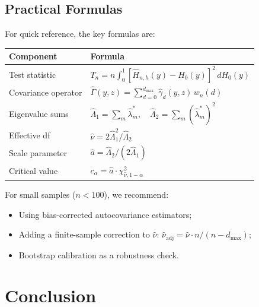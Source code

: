 \subsection{Practical Formulas}

For quick reference, the key formulas are:

\begin{tabular}{ll}
\toprule
\textbf{Component} & \textbf{Formula} \\
\midrule
Test statistic & $T_n = n \int_0^1 [\widehat{H}_{n,h}(y) - H_0(y)]^2 \, dH_0(y)$ \\
\addlinespace
Covariance operator & $\widehat{\Gamma}(y,z) = \sum_{d=0}^{d_{\max}} \widehat{\gamma}_d(y,z) \, w_n(d)$ \\
\addlinespace
Eigenvalue sums & $\widehat{\Lambda}_1 = \sum_m \widehat{\lambda}_m^*, \quad \widehat{\Lambda}_2 = \sum_m (\widehat{\lambda}_m^*)^2$ \\
\addlinespace
Effective df & $\widehat{\nu} = 2\widehat{\Lambda}_1^2 / \widehat{\Lambda}_2$ \\
\addlinespace
Scale parameter & $\widehat{a} = \widehat{\Lambda}_2 / (2\widehat{\Lambda}_1)$ \\
\addlinespace
Critical value & $c_{\alpha} = \widehat{a} \cdot \chi^2_{\widehat{\nu}, 1-\alpha}$ \\
\bottomrule
\end{tabular}

\vspace{1em}

\begin{remark}
For small samples ($n < 100$), we recommend:
\begin{itemize}
\item Using bias-corrected autocovariance estimators;
\item Adding a finite-sample correction to $\widehat{\nu}$: $\widehat{\nu}_{\text{adj}} = \widehat{\nu} \cdot n/(n - d_{\max})$;
\item Bootstrap calibration as a robustness check.
\end{itemize}
\end{remark}



\section{Conclusion}
\label{sec:conclusion}

